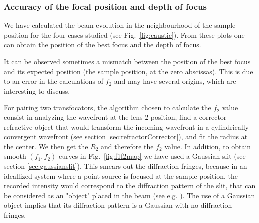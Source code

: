 \documentclass{iucr}              %
\newcommand{\inblue}[1]{{\color{blue}#1}}
\begin{document}

\subsubsection{Accuracy of the focal position and depth of focus}
\label{sec:caustic}

We have calculated the beam evolution in the neighbourhood of the sample position for the four cases studied (see Fig.~\ref{fig:caustic}). From these plots one can obtain the position of the best focus and the depth of focus.

It can be observed sometimes a mismatch between the position of the best focus and its expected position (the sample position, at the zero abscissas). This is due to an error in the calculations of $f_2$ and may have several origins, which are interesting to discuss. 

For pairing two transfocators, the algorithm chosen to calculate the $f_2$ value consist in analyzing the wavefront at the lens-2 position, find a corrector refractive object that would transform the incoming wavefront in a cylindrically convergent wavefront (see section \ref{sec:refractorCorrector}), and fit the radius at the center. We then get the $R_2$ and therefore the $f_2$ value. In addition, to obtain smooth $(f_1,f_2)$ curves in Fig.~\ref{fig:f1f2map} we have used a Gaussian slit (see section \ref{sec:gaussianslit}). This smears out the diffraction fringes, because in an ideallized system where a point source is focused at the sample position, the recorded intensity would correspond to the diffraction pattern of the slit, that can be considered as an "object" placed in the beam (see e.g. \cite{paganin_book}). The use of a Gaussian object implies that its diffraction pattern is a Gaussian with no diffraction fringes. 
\end{document}
